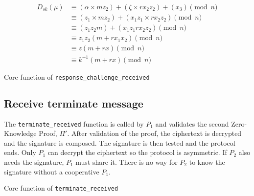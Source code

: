 \begin{equation*}
\begin{split}
  D_{sk}(\mu) &\equiv (\alpha \times mz_2) + (\zeta \times rx_2z_2) + (x_3) \pmod n \\
              &\equiv (z_1 \times mz_2) + (x_1z_1 \times rx_2z_2) \pmod n \\
              &\equiv (z_1z_2m) + (x_1z_1rx_2z_2) \pmod n \\
              &\equiv z_1z_2(m + rx_1x_2) \pmod n \\
              &\equiv z(m + rx) \pmod n \\
              &\equiv k^{-1}(m + rx) \pmod n
\end{split}
\end{equation*}

\begin{longlisting}
	\caption{Core function of \texttt{response\_challenge\_received}}
	\label{lst:implRespChallengeReceivedFunc}
\end{longlisting}

\subsection{Receive terminate message}

The \texttt{terminate\_received} function is called by $P_1$ and validates the
second Zero-Knowledge Proof, $\Pi'$. After validation of the proof, the
ciphertext is decrypted and the signature is composed. The signature is then
tested and the protocol ends. Only $P_1$ can decrypt the ciphertext so the
protocol is asymmetric. If $P_2$ also needs the signature, $P_1$ must share it.
There is no way for $P_2$ to know the signature without a cooperative $P_1$.

\begin{longlisting}
	\caption{Core function of \texttt{terminate\_received}}
	\label{lst:implTerminateReceivedFunc}
\end{longlisting}
